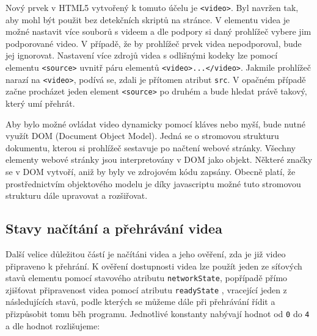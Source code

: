 Nový prvek v HTML5 vytvořený k tomuto účelu je \texttt{<video>}. Byl navržen tak, aby mohl být použit bez detekčních skriptů na stránce. V elementu videa je možné nastavit více souborů s videem a dle podpory si daný prohlížeč vybere jim podporované video.  V případě, že by prohlížeč prvek videa nepodporoval, bude jej ignorovat. \cite{HTML5_CZNIC} Nastavení více zdrojů videa s odlišnými kodeky lze pomocí elementu \texttt{<source>} uvnitř páru elementů \texttt{<video>...</video>}. Jakmile prohlížeč narazí na \texttt{<video>}, podívá se, zdali je přítomen atribut \texttt{src}. V opačném případě začne procházet jeden element \texttt{<source>} po druhém a bude hledat právě takový, který umí přehrát.

Aby bylo možné ovládat video dynamicky pomocí kláves nebo myší, bude nutné využít DOM (Document Object Model). Jedná se o stromovou strukturu dokumentu, kterou si prohlížeč sestavuje po načtení webové stránky. Všechny elementy webové stránky jsou interpretovány v DOM jako objekt. Některé značky se v DOM vytvoří, aniž by byly ve zdrojovém kódu zapsány. Obecně platí, že prostřednictvím objektového modelu je díky javascriptu možné tuto stromovou strukturu dále upravovat a rozšiřovat. 



\subsection{Stavy načítání a přehrávání videa}
Další velice důležitou částí je načítáni videa a jeho ověření, zda je již video připraveno k přehrání. K ověření dostupnosti videa lze použít jeden ze síťových stavů elementu pomocí stavového atributu \texttt{networkState}, popřípadě přímo zjišťovat připravenost videa pomocí atributu \texttt{readyState} \cite{html5}, vracející jeden z následujících stavů, podle kterých se můžeme dále při přehrávání řídit a přizpůsobit tomu běh programu. Jednotlivé konstanty nabývají hodnot od \texttt{0} do \texttt{4} a dle hodnot rozlišujeme:


